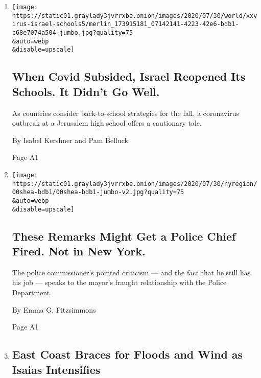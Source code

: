 \begin{enumerate}
\def\labelenumi{\arabic{enumi}.}
\item
  \href{/2020/08/04/world/middleeast/coronavirus-israel-schools-reopen.html}{}

  \texttt{[image: https://static01.graylady3jvrrxbe.onion/images/2020/07/30/world/xxvirus-israel-schools5/merlin\_173915181\_07142141-4223-42e6-bdb1-c68e7074a504-jumbo.jpg?quality=75\\\&auto=webp\\\&disable=upscale]}

  \hypertarget{when-covid-subsided-israel-reopened-its-schools-it-didnt-go-well}{%
  \subsection{When Covid Subsided, Israel Reopened Its Schools. It
  Didn't Go
  Well.}\label{when-covid-subsided-israel-reopened-its-schools-it-didnt-go-well}}

  As countries consider back-to-school strategies for the fall, a
  coronavirus outbreak at a Jerusalem high school offers a cautionary
  tale.

  By Isabel Kershner and Pam Belluck

  Page A1
\item
  \href{/2020/08/03/nyregion/police-shea-de-blasio-nyc.html}{}

  \texttt{[image: https://static01.graylady3jvrrxbe.onion/images/2020/07/30/nyregion/00shea-bdb1/00shea-bdb1-jumbo-v2.jpg?quality=75\\\&auto=webp\\\&disable=upscale]}

  \hypertarget{these-remarks-might-get-a-police-chief-fired-not-in-new-york}{%
  \subsection{These Remarks Might Get a Police Chief Fired. Not in New
  York.}\label{these-remarks-might-get-a-police-chief-fired-not-in-new-york}}

  The police commissioner's pointed criticism --- and the fact that he
  still has his job --- speaks to the mayor's fraught relationship with
  the Police Department.

  By Emma G. Fitzsimmons

  Page A1
\item
  \href{/2020/08/03/us/isaias-east-coast-landfall.html}{}

  \hypertarget{east-coast-braces-for-floods-and-wind-as-isaias-intensifies}{%
  \subsection{East Coast Braces for Floods and Wind as Isaias
  Intensifies}\label{east-coast-braces-for-floods-and-wind-as-isaias-intensifies}}


\end{enumerate}
